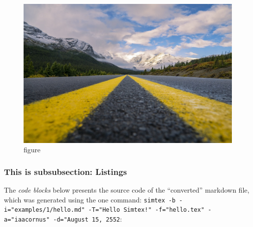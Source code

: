 \documentclass[12pt, UTF8]{article}
\begin{document}
	\begin{figure}[h]
		\includegraphics[width=\textwidth]{./sample_image.jpeg}
		\caption{figure}
	\end{figure}
	
	\subsubsection{This is subsubsection: Listings}
	
	The \emph{code blocks} below presents the source code of the ``converted'' markdown file, which was generated using the one command: \texttt{simtex -b -i="examples/1/hello.md" -T="Hello Simtex!" -f="hello.tex" -a="iaacornus" -d="August 15, 2552}:
	
\end{document}
